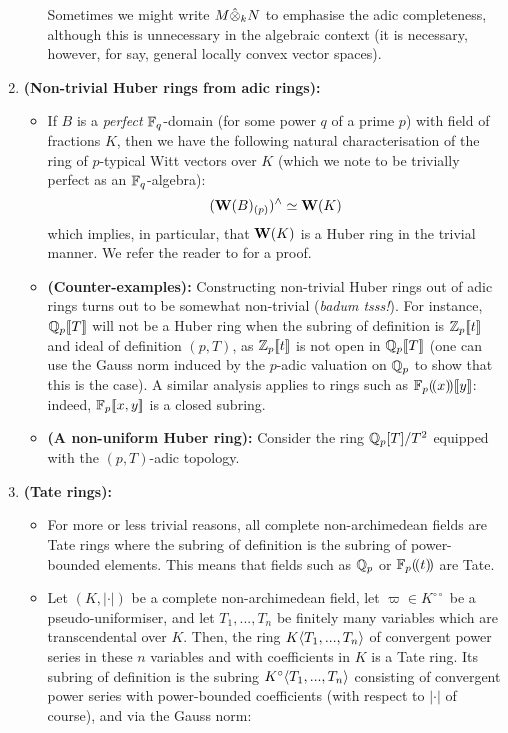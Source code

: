 \begin{example}
\begin{enumerate}
\begin{itemize}
                                Sometimes we might write $M \hat{\tensor}_k N$ to emphasise the adic completeness, although this is unnecessary in the algebraic context (it is necessary, however, for say, general locally convex vector spaces). 
                            \end{itemize}
                        \item \textbf{(Non-trivial Huber rings from adic rings):}
                            \begin{itemize}
                                \item If $B$ is a \textit{perfect} $\mathbb{F}_q$-domain (for some power $q$ of a prime $p$) with field of fractions $K$, then we have the following natural characterisation of the ring of $p$-typical Witt vectors over $K$ (which we note to be trivially perfect as an $\mathbb{F}_q$-algebra):
                                    $$(\mathbf{W}(B)_{(p)})^{\wedge} \simeq \mathbf{W}(K)$$
                                which implies, in particular, that $\mathbf{W}(K)$ is a Huber ring in the trivial manner. We refer the reader to \cite[Proposition 5.2]{shimomoto2014witt} for a proof. 
                                \item \textbf{(Counter-examples):} Constructing non-trivial Huber rings out of adic rings turns out to be somewhat non-trivial (\textit{badum tsss!}). For instance, $\mathbb{Q}_p[\![T]\!]$ will not be a Huber ring when the subring of definition is $\mathbb{Z}_p[\![t]\!]$ and ideal of definition $(p, T)$, as $\mathbb{Z}_p[\![t]\!]$ is not open in $\mathbb{Q}_p[\![T]\!]$ (one can use the Gauss norm induced by the $p$-adic valuation on $\mathbb{Q}_p$ to show that this is the case). A similar analysis applies to rings such as $\mathbb{F}_p(\!(x)\!)[\![y]\!]$: indeed, $\mathbb{F}_p[\![x, y]\!]$ is a closed subring. 
                                \item \textbf{(A non-uniform Huber ring):} Consider the ring $\mathbb{Q}_p[T]/T^2$ equipped with the $(p, T)$-adic topology. 
                            \end{itemize}
                        \item \textbf{(Tate rings):} 
                            \begin{itemize}
                                \item For more or less trivial reasons, all complete non-archimedean fields are Tate rings where the subring of definition is the subring of power-bounded elements. This means that fields such as $\mathbb{Q}_p$ or $\mathbb{F}_p(\!(t)\!)$ are Tate.
                                \item Let $(K, |\cdot|)$ be a complete non-archimedean field, let $\varpi \in K^{\circ \circ}$ be a pseudo-uniformiser, and let $T_1, ..., T_n$ be finitely many variables which are transcendental over $K$. Then, the ring $K\langle T_1, ..., T_n\rangle$ of convergent power series in these $n$ variables and with coefficients in $K$ is a Tate ring. Its subring of definition is the subring $K^{\circ}\langle T_1, ..., T_n\rangle$ consisting of convergent power series with power-bounded coefficients (with respect to $|\cdot|$ of course), and via the Gauss norm:

\end{itemize}
\end{enumerate}
\end{example}
